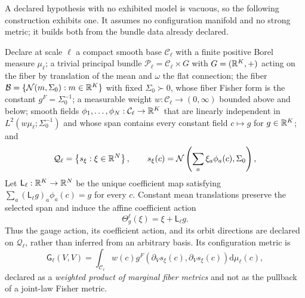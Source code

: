 A declared hypothesis with no exhibited model is vacuous, so the following
construction exhibits one.  It assumes no configuration manifold and no strong
metric; it builds both from the bundle data already declared.

Declare at scale $\ell$ a compact smooth base $\mathcal C_\ell$ with a finite
positive Borel measure $\mu_\ell$; a trivial principal bundle
$\mathscr P_\ell=\mathcal C_\ell\times G$ with $G=(\mathbb R^K,+)$ acting on the fiber by
translation of the mean and $\omega$ the flat connection; the fiber
$\mathcal B=\{\mathcal N(m,\Sigma_0):m\in\mathbb R^K\}$ with fixed $\Sigma_0\succ0$,
  whose fiber Fisher form is the constant $g^F=\Sigma_0^{-1}$; a measurable
  weight $w:\mathcal C_\ell\to(0,\infty)$ bounded above and below; smooth
  fields $\phi_1,\dots,\phi_N:\mathcal C_\ell\to\mathbb R^K$ that are linearly
  independent in $L^2(w\mu_\ell;\Sigma_0^{-1})$ and whose span contains every
  constant field $c\mapsto g$ for $g\in\mathbb R^K$; and
\begin{equation}
\mathcal Q_\ell
=\left\{s_\xi:\xi\in\mathbb R^N\right\},
\qquad
s_\xi(c)
=\mathcal N\left(\sum_a\xi_a\phi_a(c),\Sigma_0\right),
  \label{eq:hist-finite-configuration-tier}
  \end{equation}
  Let $\mathsf L_\ell:\mathbb R^K\to\mathbb R^N$ be the unique coefficient map satisfying
  $\sum_a(\mathsf L_\ell g)_a\phi_a(c)=g$ for every $c$.  Constant mean
  translations preserve the selected span and induce the affine coefficient
  action
  \begin{equation}
  \Theta^\ell_g(\xi)=\xi+\mathsf L_\ell g.
  \label{eq:hist-finite-tier-coefficient-action}
  \end{equation}
  Thus the gauge action, its coefficient action, and its orbit directions are
  declared on $\mathcal Q_\ell$, rather than inferred from an arbitrary basis.
  Its configuration metric is
\begin{equation}
\mathsf G_\ell(V,V)
=\int_{\mathcal C_\ell}w(c)
g^F\left(\partial_Vs_\xi(c),\partial_Vs_\xi(c)\right)
\mathrm d\mu_\ell(c),
\label{eq:hist-finite-configuration-metric}
\end{equation}
declared as a \emph{weighted product of marginal fiber metrics} and not as the
pullback of a joint-law Fisher metric.  

